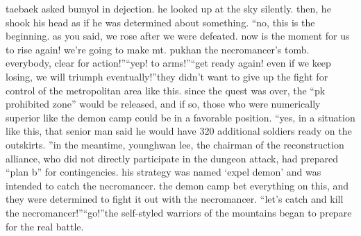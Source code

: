  taebaek asked bumyol in dejection.
 he looked up at the sky silently.
then, he shook his head as if he was determined about something.
“no, this is the beginning.
 as you said, we rose after we were defeated.
 now is the moment for us to rise again! we’re going to make mt.
 pukhan the necromancer’s tomb.
 everybody, clear for action!”“yep! to arms!”“get ready again! even if we keep losing, we will triumph eventually!”they didn’t want to give up the fight for control of the metropolitan area like this.
since the quest was over, the “pk prohibited zone” would be released, and if so, those who were numerically superior like the demon camp could be in a favorable position.
“yes, in a situation like this, that senior man said he would have 320 additional soldiers ready on the outskirts.
”in the meantime, younghwan lee, the chairman of the reconstruction alliance, who did not directly participate in the dungeon attack, had prepared “plan b” for contingencies.
his strategy was named ‘expel demon’ and was intended to catch the necromancer.
the demon camp bet everything on this, and they were determined to fight it out with the necromancer.
“let’s catch and kill the necromancer!”“go!”the self-styled warriors of the mountains began to prepare for the real battle.

